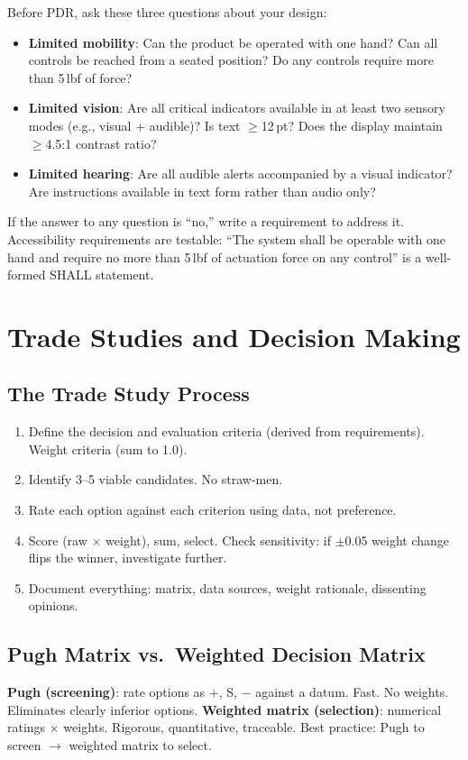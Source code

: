 \begin{tipbox}
Before PDR, ask these three questions about your design:
\begin{itemize}[nosep,leftmargin=1.5em]
\item \textbf{Limited mobility}: Can the product be operated with one hand? Can all controls be reached from a seated position? Do any controls require more than 5\,lbf of force?
\item \textbf{Limited vision}: Are all critical indicators available in at least two sensory modes (e.g., visual + audible)? Is text $\geq$12\,pt? Does the display maintain $\geq$4.5:1 contrast ratio?
\item \textbf{Limited hearing}: Are all audible alerts accompanied by a visual indicator? Are instructions available in text form rather than audio only?
\end{itemize}
If the answer to any question is ``no,'' write a requirement to address it. Accessibility requirements are testable: ``The system shall be operable with one hand and require no more than 5\,lbf of actuation force on any control'' is a well-formed SHALL statement.
\end{tipbox}

\section{Trade Studies and Decision Making}
\subsection{The Trade Study Process}
\begin{enumerate}[leftmargin=1.5em]
\item Define the decision and evaluation criteria (derived from requirements). Weight criteria (sum to 1.0).
\item Identify 3--5 viable candidates. No straw-men.
\item Rate each option against each criterion using data, not preference.
\item Score (raw $\times$ weight), sum, select. Check sensitivity: if $\pm$0.05 weight change flips the winner, investigate further.
\item Document everything: matrix, data sources, weight rationale, dissenting opinions.
\end{enumerate}

\subsection{Pugh Matrix vs.\ Weighted Decision Matrix}
\textbf{Pugh (screening)}: rate options as $+$, S, $-$ against a datum. Fast. No weights. Eliminates clearly inferior options. \textbf{Weighted matrix (selection)}: numerical ratings $\times$ weights. Rigorous, quantitative, traceable. Best practice: Pugh to screen $\to$ weighted matrix to select.

